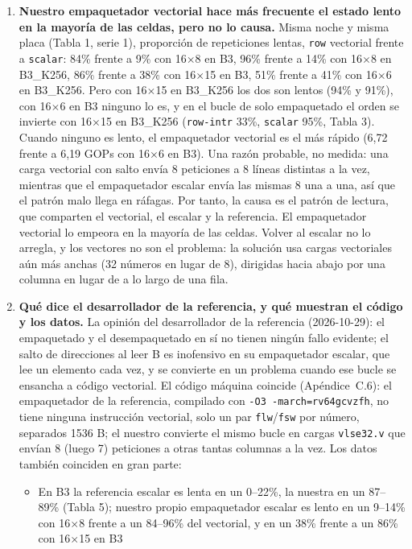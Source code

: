 \begin{enumerate}
  \item \textbf{Nuestro empaquetador vectorial hace más frecuente el estado lento en la mayoría de las celdas, pero no lo causa.} Misma
  noche y misma placa (Tabla 1, serie 1), proporción de repeticiones lentas, \texttt{row} vectorial frente a \texttt{scalar}: 84\%
  frente a 9\% con 16$\times$8 en B3, 96\% frente a 14\% con 16$\times$8 en B3\_K256, 86\% frente a 38\% con 16$\times$15 en B3, 51\%
  frente a 41\% con 16$\times$6 en B3\_K256. Pero con 16$\times$15 en B3\_K256 los dos son lentos (94\% y 91\%), con 16$\times$6 en B3
  ninguno lo es, y en el bucle de solo empaquetado el orden se invierte con 16$\times$15 en B3\_K256 (\texttt{row-intr} 33\%,
  \texttt{scalar} 95\%, Tabla 3). Cuando ninguno es lento, el empaquetador vectorial es el más rápido (6,72 frente a 6,19 GOPs con
  16$\times$6 en B3). Una razón probable, no medida: una carga vectorial con salto envía 8 peticiones a 8 líneas distintas a la vez,
  mientras que el empaquetador escalar envía las mismas 8 una a una, así que el patrón malo llega en ráfagas. Por tanto, la causa es el
  patrón de lectura, que comparten el vectorial, el escalar y la referencia. El empaquetador vectorial lo empeora en la mayoría de las
  celdas. Volver al escalar no lo arregla, y los vectores no son el problema: la solución usa cargas vectoriales aún más anchas (32
  números en lugar de 8), dirigidas hacia abajo por una columna en lugar de a lo largo de una fila.
  \item \textbf{Qué dice el desarrollador de la referencia, y qué muestran el código y los datos.} La opinión del desarrollador de la
  referencia (2026-10-29): el empaquetado y el desempaquetado en sí no tienen ningún fallo evidente; el salto de direcciones al leer B
  es inofensivo en su empaquetador escalar, que lee un elemento cada vez, y se convierte en un problema cuando ese bucle se ensancha a
  código vectorial. El código máquina coincide (Apéndice~C.6): el empaquetador de la referencia, compilado con
  \texttt{-O3 -march=rv64gcvzfh}, no tiene ninguna instrucción vectorial, solo un par \texttt{flw}/\texttt{fsw} por número, separados
  1536 B; el nuestro convierte el mismo bucle en cargas \texttt{vlse32.v} que envían 8 (luego 7) peticiones a otras tantas columnas a la
  vez. Los datos también coinciden en gran parte:
  \begin{itemize}
    \item En B3 la referencia escalar es lenta en un 0--22\%, la nuestra en un 87--89\% (Tabla 5); nuestro propio empaquetador escalar
    es lento en un 9--14\% con 16$\times$8 frente a un 84--96\% del vectorial, y en un 38\% frente a un 86\% con 16$\times$15 en B3

\end{itemize}
\end{enumerate}
